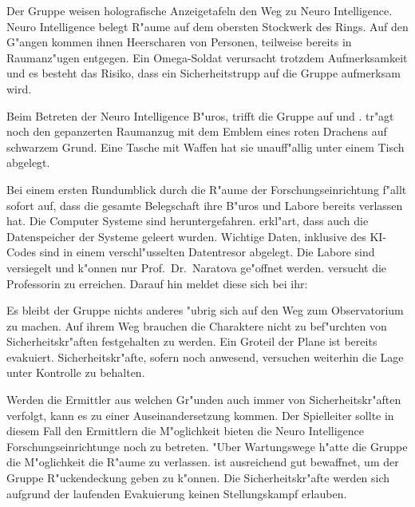 Der Gruppe weisen holografische Anzeigetafeln den Weg zu Neuro Intelligence. Neuro Intelligence belegt R"aume auf dem obersten Stockwerk des Rings. Auf den G"angen kommen ihnen Heerscharen von Personen, teilweise bereits in Raumanz"ugen entgegen. Ein Omega-Soldat verursacht trotzdem Aufmerksamkeit und es besteht das Risiko, dass ein Sicherheitstrupp auf die Gruppe aufmerksam wird.

Beim Betreten der Neuro Intelligence B"uros, trifft die Gruppe auf \xl{} und \ml{}. \xl{} tr"agt noch den gepanzerten Raumanzug mit dem Emblem eines roten Drachens auf schwarzem Grund. Eine Tasche mit Waffen hat sie unauff"allig unter einem Tisch abgelegt. 

Bei einem ersten Rundumblick durch die R"aume der Forschungseinrichtung f"allt sofort auf, dass die gesamte Belegschaft ihre B"uros und Labore bereits verlassen hat. Die Computer Systeme sind heruntergefahren. \ml{} erkl"art, dass auch die Datenspeicher der Systeme geleert wurden. Wichtige Daten, inklusive des KI-Codes sind in einem verschl"usselten Datentresor abgelegt. Die Labore sind versiegelt und k"onnen nur Prof.~Dr.~Naratova ge"offnet werden. \ml{} versucht die Professorin zu erreichen. Darauf hin meldet diese sich bei ihr:


Es bleibt der Gruppe nichts anderes "ubrig sich auf den Weg zum Observatorium zu machen. Auf ihrem Weg brauchen die Charaktere nicht zu bef"urchten von Sicherheitskr"aften festgehalten zu werden. Ein Gro\3teil der Plane ist bereits evakuiert. Sicherheitskr"afte, sofern noch anwesend, versuchen weiterhin die Lage unter Kontrolle zu behalten.

\begin{remarks}
    Werden die Ermittler aus welchen Gr"unden auch immer von Sicherheitskr"aften verfolgt, kann es zu einer Auseinandersetzung kommen. Der Spielleiter sollte in diesem Fall den Ermittlern die M"oglichkeit bieten die Neuro Intelligence Forschungseinrichtunge noch zu betreten. "Uber Wartungswege h"atte die Gruppe die M"oglichkeit die R"aume zu verlassen. \xl{} ist ausreichend gut bewaffnet, um der Gruppe R"uckendeckung geben zu k"onnen. Die Sicherheitskr"afte werden sich aufgrund der laufenden Evakuierung keinen Stellungskampf erlauben.
\end{remarks}
